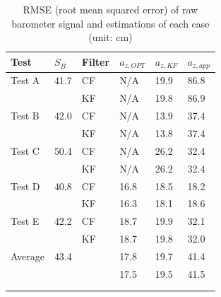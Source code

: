 \documentclass[10pt,journal,compsoc]{IEEEtran}
\begin{document}
\begin{table}[tp]
    \caption{RMSE (root mean squared error) of raw barometer signal and estimations of each case
    (unit: cm)}
\vspace*{-5mm}
\label{table:rmse}
\centering
\begin{tabular}{llllll}
\\ \toprule
\textbf{Test} & $S_B$ & \textbf{Filter} & $a_{z,OPT}$ & $a_{z,KF}$ & $a_{z,app}$ \\ \midrule
Test A & 41.7 & CF & N/A & 19.9 & 86.8\\ \hline &  & KF & N/A & 19.8 & 86.9\\ \hline
Test B & 42.0 & CF & N/A & 13.9 & 37.4\\ \hline &  & KF & N/A & 13.8 & 37.4\\ \hline
Test C & 50.4 & CF & N/A & 26.2 & 32.4\\ \hline &  & KF & N/A & 26.2 & 32.4\\ \hline
Test D & 40.8 & CF & 16.8 & 18.5 & 18.2 \\ \hline &  & KF & 16.3 & 18.1 & 18.6\\ \hline
Test E & 42.2 & CF & 18.7 & 19.9 & 32.1 \\ \hline &  & KF & 18.7 & 19.8 & 32.0\\ \hline
Average & 43.4 & & 17.8 & 19.7 & 41.4 \\ \hline &  & & 17.5 & 19.5 & 41.5\\ \hline
\\
\\
\end{tabular}
\end{table}  
\end{document}
